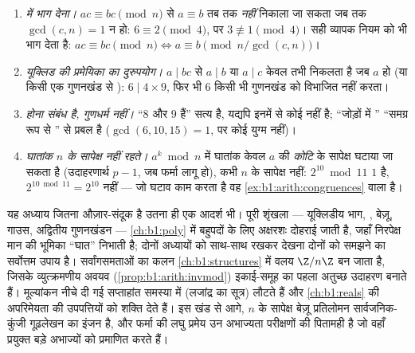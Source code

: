 \begin{remark}[अंकगणित की सामान्य भूलें]\label{rem:b1:arith:pitfalls}
\begin{enumerate}
  \item \emph{ में भाग देना।} $ac \equiv bc \pmod n$ से $a \equiv
  b$ तब तक \emph{नहीं} निकाला जा सकता जब तक $\gcd(c, n) = 1$ न हो: $6 \equiv
  2 \pmod 4$, पर $3 \not\equiv 1 \pmod 4$। सही व्यापक नियम  को भी भाग
  देता है: $ac \equiv bc \pmod n \iff a \equiv b \pmod{n/\gcd(c,n)}$।
  \item \emph{यूक्लिड की प्रमेयिका का दुरुपयोग।} $a \mid bc$ से $a \mid b$
  या $a \mid c$ केवल तभी निकलता है जब $a$ \emph{} हो (या किसी एक
  गुणनखंड से ): $6 \mid 4 \times 9$, फिर भी $6$ किसी भी गुणनखंड को
  विभाजित नहीं करता।
  \item \emph{ होना संबंध है, गुणधर्म नहीं।} ``$8$ और $9$ 
  हैं'' सत्य है, यद्यपि इनमें से कोई  नहीं है; ``जोड़ों में ''
  ``समग्र रूप से '' से प्रबल है ($\gcd(6, 10, 15) = 1$, पर कोई युग्म
   नहीं)।
  \item \emph{घातांक $n$ के सापेक्ष नहीं रहते।} $a^k \bmod n$ में घातांक
  केवल $a$ की \emph{कोटि} के सापेक्ष घटाया जा सकता है (उदाहरणार्थ $p - 1$,
  जब फर्मा लागू हो), कभी $n$ के सापेक्ष नहीं: $2^{10} \bmod 11$ $1$ है,
  $2^{10 \bmod 11} = 2^{10}$ नहीं --- जो घटाव काम करता है वह
  \cref{ex:b1:arith:congruences} वाला है।
\end{enumerate}
\end{remark}

\begin{remark}[यह अध्याय कहाँ काम आता है]\label{rem:b1:arith:whereused}
यह अध्याय जितना औज़ार-संदूक है उतना ही एक आदर्श भी। पूरी शृंखला ---
यूक्लिडीय भाग, , बेज़ू, गाउस, अद्वितीय गुणनखंडन ---
\cref{ch:b1:poly} में बहुपदों के लिए अक्षरशः दोहराई जाती है, जहाँ निरपेक्ष
मान की भूमिका ``घात'' निभाती है; दोनों अध्यायों को साथ-साथ रखकर देखना दोनों
को समझने का सर्वोत्तम उपाय है। सर्वांगसमताओं का कलन \cref{ch:b1:structures}
में वलय $\Z/n\Z$ बन जाता है, जिसके व्युत्क्रमणीय अवयव
(\cref{prop:b1:arith:invmod}) इकाई-समूह का पहला अतुच्छ उदाहरण बनाते हैं।
मूल्यांकन नीचे दी गई सप्ताहांत समस्या में (लजांद्र का सूत्र) लौटते हैं और
\cref{ch:b1:reals} की अपरिमेयता की उपपत्तियों को शक्ति देते हैं। इस खंड से
आगे, $n$ के सापेक्ष बेज़ू प्रतिलोमन सार्वजनिक-कुंजी गूढ़लेखन का इंजन है, और
फर्मा की लघु प्रमेय उन अभाज्यता परीक्षणों की पितामही है जो वहाँ प्रयुक्त
बड़े अभाज्यों को प्रमाणित करते हैं।
\end{remark}

